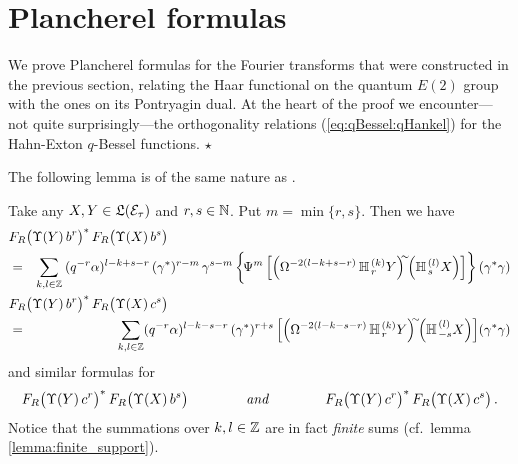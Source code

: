 \section{Plancherel formulas}
\label{sect:plancherel}

\begin{abs} \rm
We prove Plancherel formulas for the Fourier transforms that were
constructed in the previous section, relating the Haar functional
on the quantum $E(2)$ group with the ones on its Pontryagin dual.
At the heart of the proof we encounter---not quite surprisingly---the
orthogonality relations (\ref{eq:qBessel:qHankel}) for the
Hahn-Exton $q$-Bessel functions.
\hfill $\star$
\end{abs}

The following lemma is of the same nature as
\mbox{\cite[lemma 3.4.2.1]{Jeroen:QE2:haar}}.
\begin{lemma}
Take any $X,Y\in\mathfrak{L}(\mathcal E_\tau)$ and $r, s \in \mathbb{N}$. Put $m=\min\{r,s\}$.
Then we have
\begin{eqnarray*}
\lefteqn{F_R\!\left(\Upsilon(Y)\, b^r \vertM\right)^* F_R\!
                \left(\Upsilon(X)\, b^s \vertM\right) } \\
&=&
    \sum_{k,l\in\ZZ}  \: (q^{-r} \alpha)^{l-k+s-r} \,
    (\gamma^*)^{r-m} \, \gamma^{s-m}  \left\{ \! \Psi^m
    \left[ \left(\Omega^{-2(l-k+s-r)}\, \YaH{r}{k}Y\right)^{\!\!\sim} \!\!
           \left(\YaH{s}{l}X\right)
    \right] \vertXL \! \right\} (\gamma^*\gamma)
\\
\lefteqn{F_R\!\left(\Upsilon(Y)\, b^r \vertM\right)^* F_R\!
                \left(\Upsilon(X)\, c^s \vertM\right) } \\
&=&
    \sum_{k,l\in\ZZ}  (q^{-r} \alpha)^{l-k-s-r} \,
    (\gamma^*)^{r+s}
    \left[ \left(\Omega^{-2(l-k-s-r)}\, \YaH{r}{k}Y\right)^{\!\!\sim} \!\!
           \left(\YaH{-s}{l}X\right)
    \right]   \!(\gamma^*\gamma)
\end{eqnarray*}
and similar formulas for $$ F_R\!\left(\Upsilon(Y)\, c^r
\vertM\right)^* F_R\!
                \left(\Upsilon(X)\, b^s \vertM\right)
   \itandspace{4em}
   F_R\!\left(\Upsilon(Y)\, c^r \vertM\right)^* F_R\!
                \left(\Upsilon(X)\, c^s \vertM\right). $$
\rm Notice that the summations over $k,l\in \mathbb{Z}$ are in fact {\em finite\/} sums
   (cf.\ lemma \ref{lemma:finite_support}).
\end{lemma}

